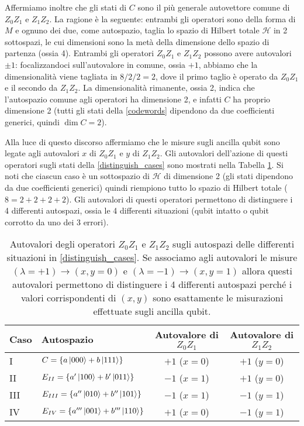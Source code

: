 \noindent Affermiamo inoltre che gli stati di $C$ sono il più generale autovettore comune di $Z_0 Z_1$ e $Z_1 Z_2$. La ragione è la seguente: entrambi gli operatori sono della forma di $M$ e ognuno dei due, come autospazio, taglia lo spazio di Hilbert totale $\mathcal{H}$ in 2 sottospazi, le cui dimensioni sono la metà della dimensione dello spazio di partenza (ossia 4). Entrambi gli operatori $Z_0 Z_1$ e $Z_1 Z_2$ possono avere autovalori $\pm 1$: focalizzandoci sull'autovalore in comune, ossia $+1$, abbiamo che la dimensionalità viene tagliata in $8/2/2 = 2$, dove il primo taglio è operato da $Z_0 Z_1$ e il secondo da $Z_1 Z_2$. La dimensionalità rimanente, ossia 2, indica che l'autospazio comune agli operatori ha dimensione 2, e infatti $C$ ha proprio dimensione 2 (tutti gli stati della \eqref{codewords} dipendono da due coefficienti generici, quindi $\dim C = 2$). 

\noindent Alla luce di questo discorso affermiamo che le misure sugli ancilla qubit sono legate agli autovalori $x$ di $Z_0 Z_1$ e $y$ di $Z_1 Z_2$. Gli autovalori dell'azione di questi operatori sugli stati della \eqref{distinguish_cases} sono mostrati nella Tabella \ref{tab:eigs_ZZ}. Si noti che ciascun caso è un sottospazio di $\mathcal{H}$ di dimensione 2 (gli stati dipendono da due coefficienti generici) quindi riempiono tutto lo spazio di Hilbert totale ($8 = 2 + 2 + 2 +2$). 
Gli autovalori di questi operatori permettono di distinguere i 4 differenti autospazi, ossia le 4 differenti situazioni (qubit intatto o qubit corrotto da uno dei 3 errori).

\begin{table}[!ht]
	\centering
    \begin{tabular}{llcc}
        \toprule
        Caso & Autospazio & Autovalore di $Z_0 Z_1$ & Autovalore di $Z_1 Z_2$ \\
        \midrule
        I & $C = \{ a \ket{000} + b \ket{111} \}$ & $+1$ ($x=0$) & $+1$ ($y=0$) \\
        II & $E_{II} = \{ a' \ket{100} + b' \ket{011} \}$ & $-1$ ($x=1$) & $+1$ ($y=0$) \\
        III & $E_{III} = \{ a'' \ket{010} + b'' \ket{101} \}$ & $-1$ ($x=1$) & $-1$ ($y=1$) \\
        IV & $E_{IV} = \{ a''' \ket{001} + b''' \ket{110} \}$ & $+1$ ($x=0$) & $-1$ ($y=1$) \\
        \bottomrule
    \end{tabular}\\
    \caption{Autovalori degli operatori $Z_0 Z_1$ e $Z_1 Z_2$ sugli autospazi delle differenti situazioni in \eqref{distinguish_cases}. Se associamo agli autovalori le misure $(\lambda = +1) \to (x, y = 0)$ e $(\lambda = -1) \to (x,y = 1)$ allora questi autovalori permettono di distinguere i 4 differenti autospazi perché i valori corrispondenti di $(x,y)$ sono esattamente le misurazioni effettuate sugli ancilla qubit.}
    \label{tab:eigs_ZZ}
\end{table}

